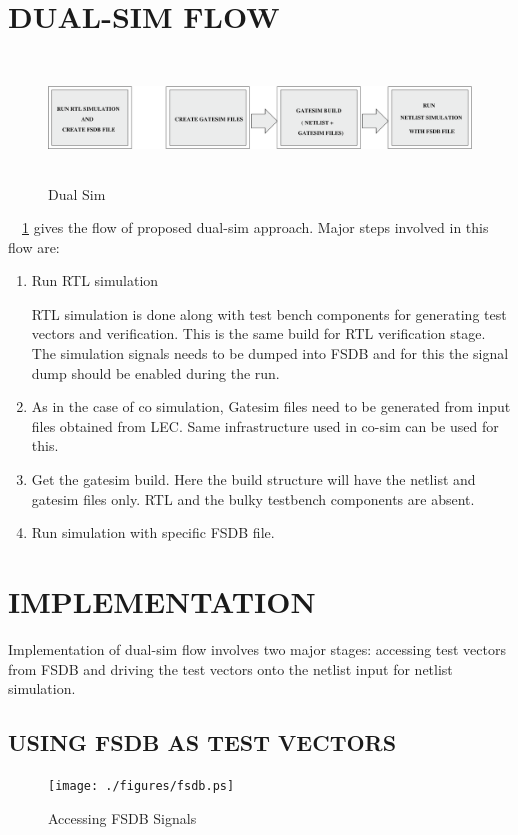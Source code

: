 \section {DUAL-SIM FLOW}

\begin{figure}[H]
\centering
\includegraphics[width=6in, height=1.3in]{./figures/dualsim_flow.eps}
\caption{Dual Sim}
\label{fig:dualsim_flow.eps}
\end{figure}

~\figurename{~\ref{fig:dualsim_flow.eps}} gives the flow of proposed dual-sim approach. Major steps involved in this flow are:

\begin{enumerate}
	\item Run RTL simulation

	RTL simulation is done along with test bench components for generating test vectors and verification. This is the same build for RTL verification stage. The simulation signals needs to be dumped into FSDB and for this the signal dump should be enabled during the run.
	\item As in the case of co simulation, Gatesim files need to be generated from input files obtained from LEC. Same infrastructure used in co-sim can be used for this.
	\item Get the gatesim build. Here the build structure will have the netlist and gatesim files only. RTL and the bulky testbench components are absent.
	\item Run simulation with specific FSDB file.
\end{enumerate}


\section{IMPLEMENTATION}

Implementation of dual-sim flow involves two major stages: accessing test vectors from FSDB and driving the test vectors onto the netlist input for netlist simulation.
\subsection{USING FSDB AS TEST VECTORS}
\begin{figure}[H]
\centering
\texttt{[image: ./figures/fsdb.ps]}
\caption{Accessing FSDB Signals}
\label{fig:fsdb.eps}
\end{figure}

